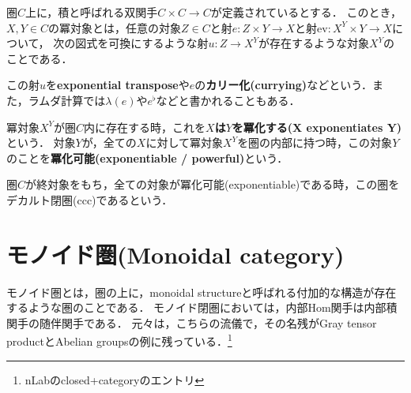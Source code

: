 \documentclass[uplatex, 12pt, dvipdfmx]{jsreport}
\begin{document}
\begin{definition}\rm{}
    圏$C$上に，積と呼ばれる双関手$C\times C\to C$が定義されているとする．
    このとき，$X, Y\in C$の冪対象とは，任意の対象$Z\in C$と射$e:Z\times Y\to X$と射$\mathrm{ev}:X^Y\times Y\to X$について，
    次の図式を可換にするような射$u:Z\to X^Y$が存在するような対象$X^Y$のことである．
    \begin{center}\end{center}
    この射$u$を\textbf{exponential transpose}や$e$の\textbf{カリー化(currying)}などという．また，ラムダ計算では$\lambda(e)$や$e^\flat$などと書かれることもある．
\end{definition}
冪対象$X^Y$が圏$C$内に存在する時，これを\textbf{$X$は$Y$を冪化する(X exponentiates Y)}という．
対象$Y$が，全ての$X$に対して冪対象$X^Y$を圏の内部に持つ時，この対象$Y$のことを\textbf{冪化可能(exponentiable / powerful)}という．

\begin{definition}\rm{}
    圏$C$が終対象をもち，全ての対象が冪化可能(exponentiable)である時，この圏をデカルト閉圏(ccc)であるという．
\end{definition}

\chapter{モノイド圏(Monoidal category)}
モノイド圏とは，圏の上に，monoidal structureと呼ばれる付加的な構造が存在するような圏のことである．
モノイド閉圏においては，内部Hom関手は内部積関手の随伴関手である．
元々は，こちらの流儀で，その名残がGray tensor productとAbelian groupsの例に残っている．\footnote{nLabのclosed+categoryのエントリ}
\end{document}
